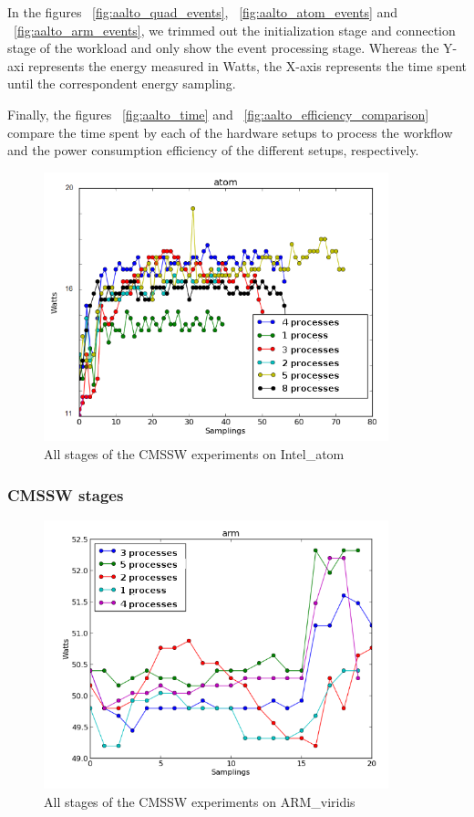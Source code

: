 In the figures ~\ref{fig:aalto_quad_events}, ~\ref{fig:aalto_atom_events} and ~\ref{fig:aalto_arm_events}, we trimmed out the initialization stage and connection stage of the workload and only show the event processing stage. Whereas the Y-axi represents the energy measured in Watts, the X-axis represents the time spent until the correspondent energy sampling.

Finally, the figures ~\ref{fig:aalto_time} and ~\ref{fig:aalto_efficiency_comparison} compare the time spent by each of the hardware setups to process the workflow and the power consumption efficiency of the different setups, respectively.

\begin{figure}[h]
  \centering
    \includegraphics[width=100mm]{"img/aalto/aalto_total_atom"}
    \caption{All stages of the CMSSW experiments on Intel\_atom}
    \label{fig:aalto_atom_clamp}
\end{figure}



\subsubsection*{CMSSW stages}

\begin{figure}[h]
  \centering
    \includegraphics[width=100mm]{"img/aalto/aalto_total_arm"}
    \caption{All stages of the CMSSW experiments on ARM\_viridis}
    \label{fig:aalto_arm_clamp}
\end{figure}

